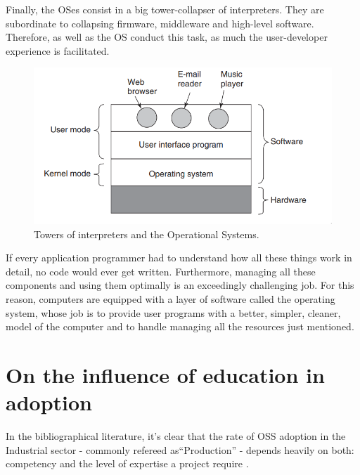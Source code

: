 \documentclass[
12pt,				%
openright,			%
oneside,			%
a4paper,			%
brazil,				%
english,			%
]{abntex2}
\begin{document}
Finally, the OSes consist in a big tower-collapser of
interpreters. They are subordinate to collapsing firmware, middleware
and high-level software. Therefore, as well as the OS conduct this task,
as much the user-developer experience is facilitated.

\begin{figure}[ht]
  \centering
 \caption{\label{fig:os} Towers of interpreters and the Operational Systems.}
  \includegraphics[width=0.5\linewidth]{tower-os.png}
\end{figure}

\begin{citacao}
If every application programmer had to understand how all these things work in detail, no code would ever
get written. Furthermore, managing all these components and using them optimally
is an exceedingly challenging job. For this reason, computers are equipped with a
layer of software called the operating system, whose job is to provide
user programs with a better, simpler, cleaner, model of the computer
and to handle managing all the resources just mentioned. \cite{tanenbaum2015modern}
\end{citacao}

\section{On the influence of education in adoption}

In the bibliographical literature, it's clear that the rate of OSS adoption in the Industrial sector - commonly refereed as``Production'' - depends heavily on both: competency and the level of expertise a project require \cite{li2013all,gallego2015open,spinellis2012organizational}.
\end{document}
